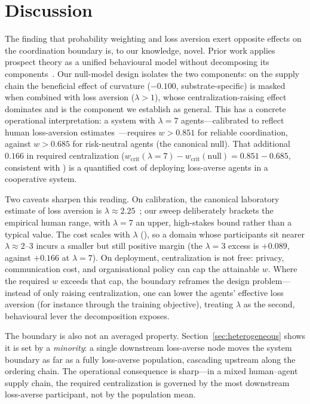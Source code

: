 \documentclass[letterpaper]{article}
\theoremstyle{plain}
\newcommand{\wcrit}{w_{\mathrm{crit}}}
\begin{document}
\section{Discussion}
\label{sec:discussion}

The finding that probability weighting and loss aversion exert opposite
effects on the coordination boundary is, to our knowledge, novel.
Prior work applies prospect theory as a unified behavioural model without
decomposing its components~\citep{lalmohammed2025,ghaemi2024risk}.
Our null-model design isolates the two components: on the supply chain the
beneficial effect of curvature ($-0.100$, substrate-specific) is masked when
combined with loss aversion ($\lambda{>}1$), whose centralization-raising effect
dominates and is the component we establish as general.
This has a concrete operational interpretation: a system with $\lambda{=}7$
agents---calibrated to reflect human loss-aversion
estimates~\citep{tversky1992}---requires $w > 0.851$ for reliable
coordination, against $w > 0.685$ for risk-neutral agents (the canonical
null). That additional $0.166$ in required centralization
($\wcrit(\lambda{=}7) - \wcrit(\text{null}) = 0.851 - 0.685$, consistent with
) is a quantified cost of deploying loss-averse
agents in a cooperative system.

Two caveats sharpen this reading. On calibration, the canonical laboratory
estimate of loss aversion is $\lambda\approx2.25$~\citep{tversky1992}; our
sweep deliberately brackets the empirical human range, with $\lambda{=}7$ an
upper, high-stakes bound rather than a typical value. The cost scales with
$\lambda$ (), so a domain whose participants sit nearer
$\lambda\approx2$--$3$ incurs a smaller but still positive margin (the
$\lambda{=}3$ excess is $+0.089$, against $+0.166$ at $\lambda{=}7$). On
deployment, centralization is not free: privacy, communication cost, and
organisational policy can cap the attainable $w$. Where the required $w$
exceeds that cap, the boundary reframes the design problem---instead of only
raising centralization, one can lower the agents' effective loss aversion
(for instance through the training objective), treating $\lambda$ as the
second, behavioural lever the decomposition exposes.

The boundary is also not an averaged property. Section~\ref{sec:heterogeneous}
shows it is set by a \emph{minority}: a single downstream loss-averse node
moves the system boundary as far as a fully loss-averse population, cascading
upstream along the ordering chain. The operational consequence is sharp---in a
mixed human--agent supply chain, the required centralization is governed by the
most downstream loss-averse participant, not by the population mean.
\end{document}

